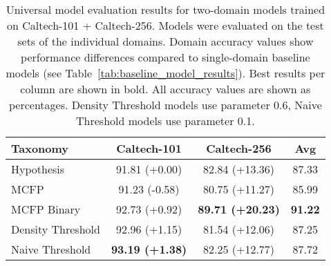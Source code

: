 \begin{table}[ht]
\centering
\caption{Universal model evaluation results for two-domain models trained on Caltech-101 + Caltech-256. Models were evaluated on the test sets of the individual domains. Domain accuracy values show performance differences compared to single-domain baseline models (see Table~\ref{tab:baseline_model_results}). Best results per column are shown in bold. All accuracy values are shown as percentages. Density Threshold models use parameter 0.6, Naive Threshold models use parameter 0.1.}
\label{tab:universal_model_results_2domain}
\begin{tabular}{lccc}
\toprule
Taxonomy & Caltech-101 & Caltech-256 & Avg \\
\midrule
Hypothesis & 91.81 (+0.00) & 82.84 (+13.36) & 87.33 \\
MCFP & 91.23 (-0.58) & 80.75 (+11.27) & 85.99 \\
MCFP Binary & 92.73 (+0.92) & \textbf{89.71 (+20.23)} & \textbf{91.22} \\
Density Threshold & 92.96 (+1.15) & 81.54 (+12.06) & 87.25 \\
Naive Threshold & \textbf{93.19 (+1.38)} & 82.25 (+12.77) & 87.72 \\
\bottomrule
\end{tabular}
\end{table}
